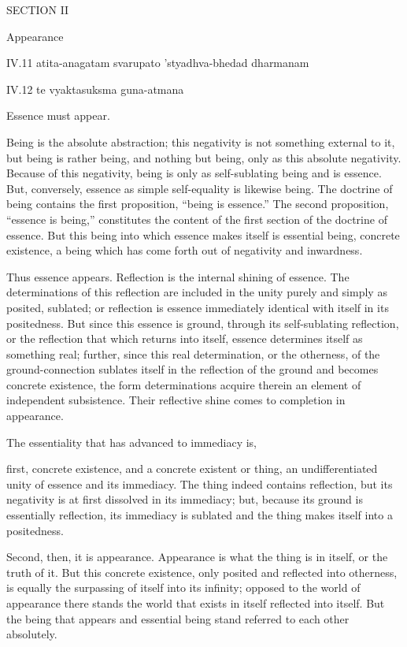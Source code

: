 SECTION II

Appearance

IV.11
atita-anagatam svarupato 'styadhva-bhedad dharmanam

IV.12
te vyaktasuksma guna-atmana

Essence must appear.

Being is the absolute abstraction;
this negativity is not something external to it,
but being is rather being, and nothing but being,
only as this absolute negativity.
Because of this negativity,
being is only as self-sublating being and is essence.
But, conversely, essence as simple self-equality is likewise being.
The doctrine of being contains the first proposition,
“being is essence.”
The second proposition, “essence is being,”
constitutes the content of the first section of the doctrine of essence.
But this being into which essence makes itself is essential being,
concrete existence, a being which has
come forth out of negativity and inwardness.

Thus essence appears.
Reflection is the internal shining of essence.
The determinations of this reflection are included
in the unity purely and simply as posited, sublated;
or reflection is essence immediately identical
with itself in its positedness.
But since this essence is ground, through its self-sublating reflection,
or the reflection that which returns into itself,
essence determines itself as something real;
further, since this real determination,
or the otherness, of the ground-connection sublates itself
in the reflection of the ground and becomes concrete existence,
the form determinations acquire therein an element of independent subsistence.
Their reflective shine comes to completion in appearance.

The essentiality that has advanced to immediacy is,

first, concrete existence, and a concrete existent or thing,
an undifferentiated unity of essence and its immediacy.
The thing indeed contains reflection, but its negativity is
at first dissolved in its immediacy;
but, because its ground is essentially reflection,
its immediacy is sublated
and the thing makes itself into a positedness.

Second, then, it is appearance.
Appearance is what the thing is in itself,
or the truth of it.
But this concrete existence,
only posited and reflected into otherness,
is equally the surpassing of itself into its infinity;
opposed to the world of appearance there stands
the world that exists in itself reflected into itself.
But the being that appears and essential being
stand referred to each other absolutely.

